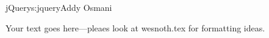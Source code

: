 \begin{aosachapter}{jQuery}{s:jquery}{Addy Osmani}

Your text goes here---pleaes look at wesnoth.tex for formatting ideas.

\end{aosachapter}
